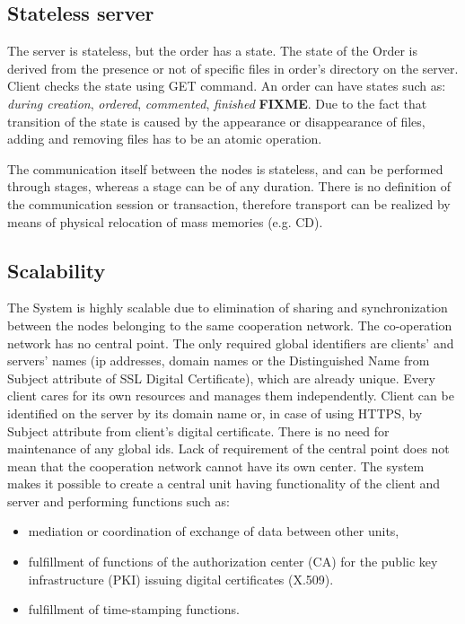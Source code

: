\documentclass[a4paper]{article}
\begin{document}
\subsection{Stateless server}

The server is stateless, but the order has a state. The state of the Order is derived 
from the presence or not of specific files in order's directory
on the server. Client checks the state using GET command. An order can
have states such as: \emph{during creation}, \emph{ordered}, \emph{commented},
\emph{finished} \textbf{FIXME}. Due to the fact that transition of the state is caused by 
the appearance or disappearance of files, adding and removing files has to be an atomic 
operation. 

The communication itself between the nodes is stateless, and can be performed through stages, 
whereas a stage can be of any duration. There is no definition of the communication session
or transaction, therefore transport can be realized by means of physical relocation of mass
memories (e.g. CD).

\subsection{Scalability}

The System is highly scalable due to elimination of sharing and synchronization between the 
nodes belonging to the same cooperation network. The co-operation network has no central point. 
The only required global identifiers are clients' and servers' names (ip addresses, domain names 
or the Distinguished Name from Subject attribute of SSL Digital Certificate),
which are already unique. Every client cares for its own resources and manages them independently. 
Client can be identified on the server by its domain name or, in case of using HTTPS, by 
Subject attribute from client's digital certificate. There is no need for maintenance of any 
global ids.
	Lack of requirement of the central point does not mean that the cooperation network cannot
have its own center. The system makes it possible to create a central unit having functionality
of the client and server and performing functions such as:
\begin{itemize}
	\item mediation or coordination of exchange of data between other units,
	\item fulfillment of functions of the authorization center (CA) for the public key infrastructure (PKI) issuing digital certificates (X.509).
	\item fulfillment of time-stamping functions.
\end{itemize}
\end{document}
